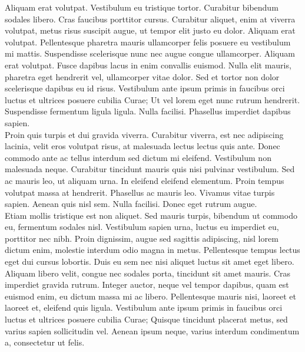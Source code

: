 Aliquam erat volutpat. Vestibulum eu tristique tortor. Curabitur bibendum sodales libero. Cras faucibus porttitor cursus. Curabitur aliquet, enim at viverra volutpat, metus risus suscipit augue, ut tempor elit justo eu dolor. Aliquam erat volutpat. Pellentesque pharetra mauris ullamcorper felis posuere eu vestibulum mi mattis. Suspendisse scelerisque nunc nec augue congue ullamcorper. Aliquam erat volutpat. Fusce dapibus lacus in enim convallis euismod. Nulla elit mauris, pharetra eget hendrerit vel, ullamcorper vitae dolor. Sed et tortor non dolor scelerisque dapibus eu id risus. Vestibulum ante ipsum primis in faucibus orci luctus et ultrices posuere cubilia Curae; Ut vel lorem eget nunc rutrum hendrerit. Suspendisse fermentum ligula ligula. Nulla facilisi. Phasellus imperdiet dapibus sapien.\\

Proin quis turpis et dui gravida viverra. Curabitur viverra, est nec adipiscing lacinia, velit eros volutpat risus, at malesuada lectus lectus quis ante. Donec commodo ante ac tellus interdum sed dictum mi eleifend. Vestibulum non malesuada neque. Curabitur tincidunt mauris quis nisi pulvinar vestibulum. Sed ac mauris leo, ut aliquam urna. In eleifend eleifend elementum. Proin tempus volutpat massa at hendrerit. Phasellus ac mauris leo. Vivamus vitae turpis sapien. Aenean quis nisl sem. Nulla facilisi. Donec eget rutrum augue.\\

Etiam mollis tristique est non aliquet. Sed mauris turpis, bibendum ut commodo eu, fermentum sodales nisl. Vestibulum sapien urna, luctus eu imperdiet eu, porttitor nec nibh. Proin dignissim, augue sed sagittis adipiscing, nisl lorem dictum enim, molestie interdum odio magna in metus. Pellentesque tempus lectus eget dui cursus lobortis. Duis eu sem nec nisi aliquet luctus sit amet eget libero. Aliquam libero velit, congue nec sodales porta, tincidunt sit amet mauris. Cras imperdiet gravida rutrum. Integer auctor, neque vel tempor dapibus, quam est euismod enim, eu dictum massa mi ac libero. Pellentesque mauris nisi, laoreet et laoreet et, eleifend quis ligula. Vestibulum ante ipsum primis in faucibus orci luctus et ultrices posuere cubilia Curae; Quisque tincidunt placerat metus, sed varius sapien sollicitudin vel. Aenean ipsum neque, varius interdum condimentum a, consectetur ut felis.

